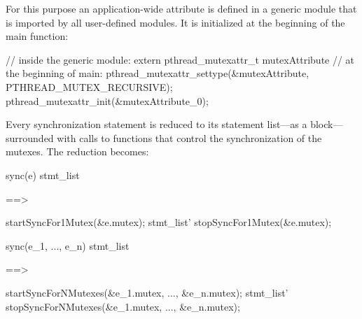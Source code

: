 For this purpose an application-wide attribute is defined in a generic module that is imported by all user-defined modules. It is initialized at the beginning of the main function:
\begin{ccode}
// inside the generic module:
extern pthread_mutexattr_t mutexAttribute
// at the beginning of main:
pthread_mutexattr_settype(&mutexAttribute, PTHREAD_MUTEX_RECURSIVE);
pthread_mutexattr_init(&mutexAttribute_0);
\end{ccode}
Every synchronization statement is reduced to its statement list---as a block---surrounded with calls to functions that control the synchronization of the mutexes. The reduction becomes:

\begin{center}
\begin{minipage}{0.4\textwidth}
\begin{ccode}
sync(e) stmt_list
\end{ccode}
\end{minipage}
\qquad==>\qquad
\begin{minipage}{0.4\textwidth}
\begin{ccode}
startSyncFor1Mutex(&e.mutex);
stmt_list'
stopSyncFor1Mutex(&e.mutex);
\end{ccode}
\end{minipage}
\end{center}


\begin{center}
\begin{minipage}{0.4\textwidth}
\begin{ccode}
sync(e_1, ..., e_n) stmt_list
\end{ccode}
\end{minipage}
\qquad==>\qquad
\begin{minipage}{0.4\textwidth}
\begin{ccode}
startSyncForNMutexes(&e_1.mutex, ..., &e_n.mutex);
stmt_list'
stopSyncForNMutexes(&e_1.mutex, ..., &e_n.mutex);
\end{ccode}
\end{minipage}
\end{center}

